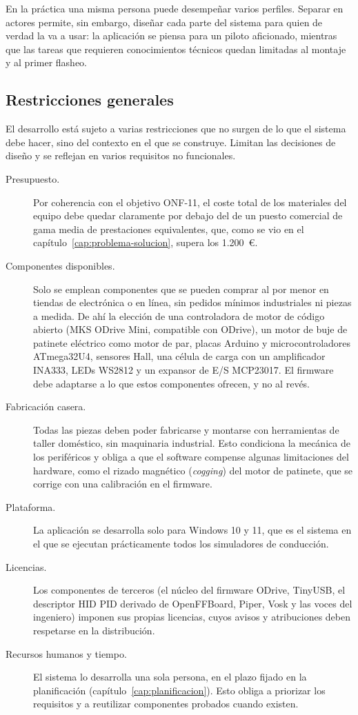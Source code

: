 En la práctica una misma persona puede desempeñar varios perfiles. Separar en actores permite, sin embargo, diseñar cada parte del sistema para quien de verdad la va a usar: la aplicación se piensa para un piloto aficionado, mientras que las tareas que requieren conocimientos técnicos quedan limitadas al montaje y al primer flasheo.

\subsection{Restricciones generales}
\label{subsec:restricciones}
El desarrollo está sujeto a varias restricciones que no surgen de lo que el sistema debe hacer, sino del contexto en el que se construye. Limitan las decisiones de diseño y se reflejan en varios requisitos no funcionales.

\begin{description}
	\item[Presupuesto.] Por coherencia con el objetivo ONF-11, el coste total de los materiales del equipo debe quedar claramente por debajo del de un puesto comercial de gama media de prestaciones equivalentes, que, como se vio en el capítulo~\ref{cap:problema-solucion}, supera los 1.200~€.
	\item[Componentes disponibles.] Solo se emplean componentes que se pueden comprar al por menor en tiendas de electrónica o en línea, sin pedidos mínimos industriales ni piezas a medida. De ahí la elección de una controladora de motor de código abierto (MKS ODrive Mini, compatible con ODrive), un motor de buje de patinete eléctrico como motor de par, placas Arduino y microcontroladores ATmega32U4, sensores Hall, una célula de carga con un amplificador INA333, LEDs WS2812 y un expansor de E/S MCP23017. El firmware debe adaptarse a lo que estos componentes ofrecen, y no al revés.
	\item[Fabricación casera.] Todas las piezas deben poder fabricarse y montarse con herramientas de taller doméstico, sin maquinaria industrial. Esto condiciona la mecánica de los periféricos y obliga a que el software compense algunas limitaciones del hardware, como el rizado magnético (\emph{cogging}) del motor de patinete, que se corrige con una calibración en el firmware.
	\item[Plataforma.] La aplicación se desarrolla solo para Windows 10 y 11, que es el sistema en el que se ejecutan prácticamente todos los simuladores de conducción.
	\item[Licencias.] Los componentes de terceros (el núcleo del firmware ODrive, TinyUSB, el descriptor HID PID derivado de OpenFFBoard, Piper, Vosk y las voces del ingeniero) imponen sus propias licencias, cuyos avisos y atribuciones deben respetarse en la distribución.
	\item[Recursos humanos y tiempo.] El sistema lo desarrolla una sola persona, en el plazo fijado en la planificación (capítulo~\ref{cap:planificacion}). Esto obliga a priorizar los requisitos y a reutilizar componentes probados cuando existen.
\end{description}

